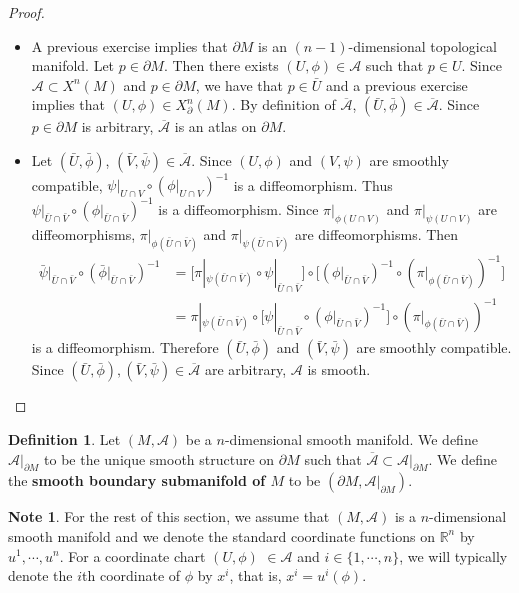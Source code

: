 \documentclass{book}
\theoremstyle{definition}
\newtheorem{defn}[definition]{Definition}
\newtheorem{note}[definition]{Note}
\newcommand{\R}{\mathbb{R}}
\newcommand{\MA}{\mathcal{A}}
\DeclareMathOperator*{\0}{\mbf{0}}
\DeclareMathOperator*{\1}{\mbf{1}}
\newcommand{\tbf}[1]{\textbf{#1}}
\newcommand{\ol}[1]{\overline{#1}}
\newcommand{\p}{\partial}
\begin{document}
	\begin{proof}\
		\begin{itemize}
			\item A previous exercise implies that $\p M$ is an $(n-1)$-dimensional topological manifold. Let $p \in \partial M$. Then there exists $(U, \phi) \in \MA$ such that $p \in U$. Since $\MA \subset X^n(M)$ and $p \in \p M$, we have that $p \in \bar{U}$ and a previous exercise implies that $(U, \phi) \in X^n_{\p}(M)$. By definition of $\ol{\MA}$, $(\bar{U}, \bar{\phi}) \in \ol{\MA}$. Since $p \in \p M$ is arbitrary, $\ol{\MA}$ is an atlas on $\p M$. 
			
			
			\item Let $(\bar{U}, \bar{\phi})$, $(\bar{V}, \bar{\psi}) \in \ol{\MA}$. Since $(U, \phi)$ and $(V, \psi)$ are smoothly compatible, $\psi|_{U \cap V} \circ (\phi|_{U \cap V})^{-1}$ is a diffeomorphism. Thus $\psi|_{\bar{U} \cap \bar{V}} \circ (\phi|_{\bar{U} \cap \bar{V}})^{-1}$ is a diffeomorphism. Since $\pi|_{\phi(U \cap V)}$ and $\pi|_{\psi(U \cap V)}$ are diffeomorphisms, $\pi|_{\phi(\bar{U} \cap \bar{V})}$ and $\pi|_{\psi(\bar{U} \cap \bar{V})}$ are diffeomorphisms. Then 
			\begin{align*}
				\bar{\psi}|_{\bar{U} \cap \bar{V}} \circ (\bar{\phi}|_{\bar{U} \cap \bar{V}})^{-1}
				& = \bigg[ \pi|_{\psi(\bar{U} \cap \bar{V})} \circ \psi|_{\bar{U} \cap \bar{V}} \bigg] \circ \bigg[ (\phi|_{\bar{U} \cap \bar{V}})^{-1} \circ( \pi|_{\phi(\bar{U} \cap \bar{V})})^{-1} \bigg] \\
				& =\pi|_{\psi(\bar{U} \cap \bar{V})} \circ \bigg[ \psi|_{\bar{U} \cap \bar{V}} \circ (\phi|_{\bar{U} \cap \bar{V}})^{-1} \bigg] \circ (\pi|_{\phi(\bar{U} \cap \bar{V})})^{-1}
			\end{align*}
			is a diffeomorphism. Therefore $(\bar{U}, \bar{\phi})$ and $(\bar{V}, \bar{\psi})$ are smoothly compatible. Since $(\bar{U}, \bar{\phi}), (\bar{V}, \bar{\psi}) \in \ol{\MA}$ are arbitrary, $\MA$ is smooth.
		\end{itemize}
	\end{proof}

	\begin{defn}
		Let $(M, \MA)$ be a $n$-dimensional smooth manifold. We define $\MA|_{\p M}$ to be the unique smooth structure on $\p M$ such that $\ol{\MA} \subset \MA|_{\p M}$. We define the \tbf{smooth boundary submanifold of $M$} to be $(\p M, \MA|_{\p M})$.
	\end{defn}
	
	\begin{note}
		For the rest of this section, we assume that $(M, \MA)$ is a $n$-dimensional smooth manifold and we denote the standard coordinate functions on $\R^n$ by $u^1, \cdots, u^n$. For a coordinate chart $(U, \phi)$ $\in \MA$ and $i \in \{1, \cdots, n\}$, we will typically denote the $i$th coordinate of $\phi$ by $x^i$, that is,  $x^i = u^i(\phi)$.
	\end{note}
	
\end{document}
